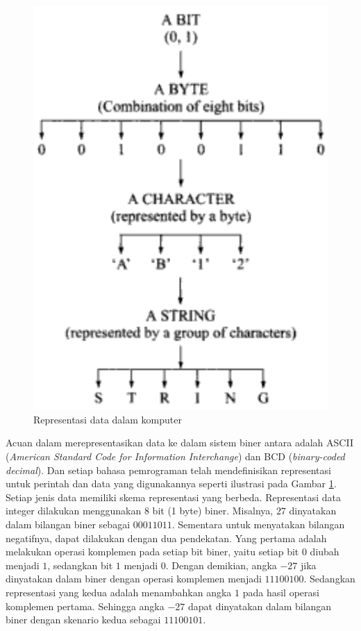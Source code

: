 \begin{figure}[H]
\centering
\includegraphics[scale=.45]{pics/dataRepresentation.png}
\caption{Representasi data dalam komputer}
\label{fig:dataRep}
\end{figure}

Acuan dalam merepresentasikan data ke dalam sistem biner antara adalah ASCII (\textit{American Standard Code for Information Interchange}) dan BCD (\textit{binary-coded decimal}). Dan setiap bahasa pemrograman telah mendefinisikan representasi untuk perintah dan data yang digunakannya seperti ilustrasi pada Gambar \ref{fig:dataRep}. Setiap jenis data memiliki skema representasi yang berbeda. Representasi data integer dilakukan menggunakan 8 bit (1 byte) biner. Misalnya, $27$ dinyatakan dalam bilangan biner sebagai $00011011$. Sementara untuk menyatakan bilangan negatifnya, dapat dilakukan dengan dua pendekatan. Yang pertama adalah melakukan operasi komplemen pada setiap bit biner, yaitu setiap bit $0$ diubah menjadi $1$, sedangkan bit $1$ menjadi $0$. Dengan demikian, angka $-27$ jika dinyatakan dalam biner dengan operasi komplemen menjadi $11100100$. Sedangkan representasi yang kedua adalah menambahkan angka $1$ pada hasil operasi komplemen pertama. Sehingga angka $-27$ dapat dinyatakan dalam bilangan biner dengan skenario kedua sebagai $11100101$.

